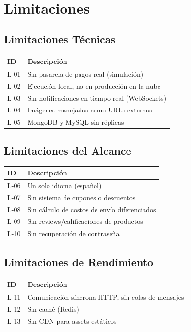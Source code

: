 \documentclass[12pt,a4paper]{article}
\begin{document}
\newpage
\section{Limitaciones}

\subsection{Limitaciones T\'ecnicas}
\begin{table}[H]
\centering
\begin{tabularx}{\textwidth}{lX}
\toprule
\textbf{ID} & \textbf{Descripci\'on} \\
\midrule
L-01 & Sin pasarela de pagos real (simulaci\'on) \\
L-02 & Ejecuci\'on local, no en producci\'on en la nube \\
L-03 & Sin notificaciones en tiempo real (WebSockets) \\
L-04 & Im\'agenes manejadas como URLs externas \\
L-05 & MongoDB y MySQL sin r\'eplicas \\
\bottomrule
\end{tabularx}
\end{table}

\subsection{Limitaciones del Alcance}
\begin{table}[H]
\centering
\begin{tabularx}{\textwidth}{lX}
\toprule
\textbf{ID} & \textbf{Descripci\'on} \\
\midrule
L-06 & Un solo idioma (espa\~nol) \\
L-07 & Sin sistema de cupones o descuentos \\
L-08 & Sin c\'alculo de costos de env\'io diferenciados \\
L-09 & Sin reviews/calificaciones de productos \\
L-10 & Sin recuperaci\'on de contrase\~na \\
\bottomrule
\end{tabularx}
\end{table}

\subsection{Limitaciones de Rendimiento}
\begin{table}[H]
\centering
\begin{tabularx}{\textwidth}{lX}
\toprule
\textbf{ID} & \textbf{Descripci\'on} \\
\midrule
L-11 & Comunicaci\'on s\'incrona HTTP, sin colas de mensajes \\
L-12 & Sin cach\'e (Redis) \\
L-13 & Sin CDN para assets est\'aticos \\
\bottomrule
\end{tabularx}
\end{table}
\end{document}
